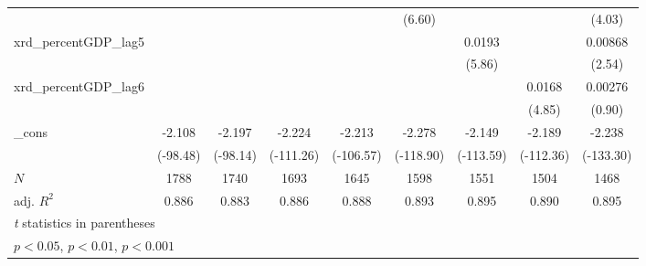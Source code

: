 {\begin{tabular}{l*{8}{c}}
          &                  &                  &                  &                  &   (6.60)         &                  &                  &   (4.03)         \\
\addlinespace
xrd\_percentGDP\_lag5&                  &                  &                  &                  &                  &   0.0193\sym{***}&                  &  0.00868\sym{*}  \\
          &                  &                  &                  &                  &                  &   (5.86)         &                  &   (2.54)         \\
\addlinespace
xrd\_percentGDP\_lag6&                  &                  &                  &                  &                  &                  &   0.0168\sym{***}&  0.00276         \\
          &                  &                  &                  &                  &                  &                  &   (4.85)         &   (0.90)         \\
\addlinespace
\_cons    &   -2.108\sym{***}&   -2.197\sym{***}&   -2.224\sym{***}&   -2.213\sym{***}&   -2.278\sym{***}&   -2.149\sym{***}&   -2.189\sym{***}&   -2.238\sym{***}\\
          & (-98.48)         & (-98.14)         &(-111.26)         &(-106.57)         &(-118.90)         &(-113.59)         &(-112.36)         &(-133.30)         \\
\midrule
\(N\)     &     1788         &     1740         &     1693         &     1645         &     1598         &     1551         &     1504         &     1468         \\
adj. \(R^{2}\)&    0.886         &    0.883         &    0.886         &    0.888         &    0.893         &    0.895         &    0.890         &    0.895         \\
\bottomrule
\multicolumn{9}{l}{\footnotesize \textit{t} statistics in parentheses}\\
\multicolumn{9}{l}{\footnotesize \sym{*} \(p<0.05\), \sym{**} \(p<0.01\), \sym{***} \(p<0.001\)}\\
\end{tabular}
}
